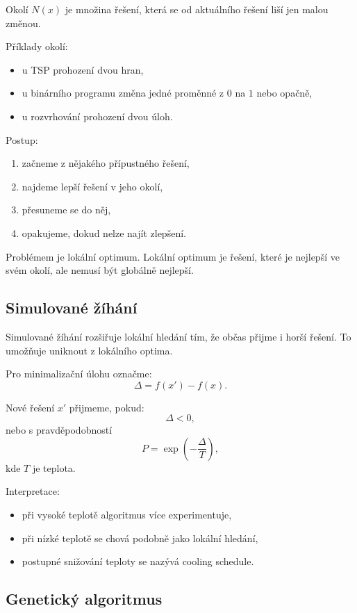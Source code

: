 Okolí $N(x)$ je množina řešení, která se od aktuálního řešení liší jen malou změnou.

Příklady okolí:
\begin{itemize}
    \item u TSP prohození dvou hran,
    \item u binárního programu změna jedné proměnné z $0$ na $1$ nebo opačně,
    \item u rozvrhování prohození dvou úloh.
\end{itemize}

Postup:
\begin{enumerate}
    \item začneme z nějakého přípustného řešení,
    \item najdeme lepší řešení v jeho okolí,
    \item přesuneme se do něj,
    \item opakujeme, dokud nelze najít zlepšení.
\end{enumerate}

Problémem je lokální optimum. Lokální optimum je řešení, které je nejlepší ve svém okolí, ale nemusí být
globálně nejlepší.

\subsection{Simulované žíhání}

Simulované žíhání rozšiřuje lokální hledání tím, že občas přijme i horší řešení. To umožňuje uniknout
z lokálního optima.

Pro minimalizační úlohu označme:
\[
\Delta=f(x')-f(x).
\]

Nové řešení $x'$ přijmeme, pokud:
\[
\Delta<0,
\]
nebo s pravděpodobností
\[
P=\exp\left(-\frac{\Delta}{T}\right),
\]
kde $T$ je teplota.

Interpretace:
\begin{itemize}
    \item při vysoké teplotě algoritmus více experimentuje,
    \item při nízké teplotě se chová podobně jako lokální hledání,
    \item postupné snižování teploty se nazývá cooling schedule.
\end{itemize}

\subsection{Genetický algoritmus}

